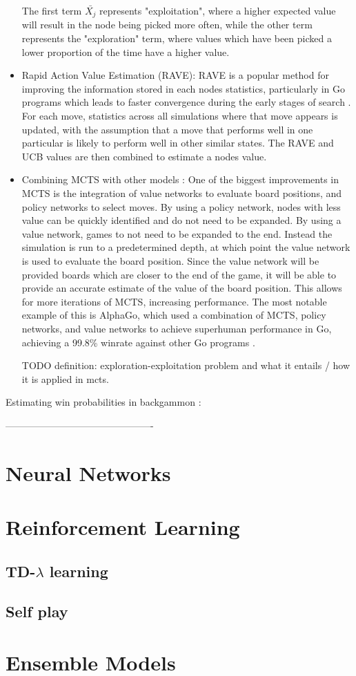 \begin{itemize}
    The first term $\bar{X_j}$ represents "exploitation", where a higher expected value will result in the node being picked more often, while the other term represents the "exploration" term, where values which have been picked a lower proportion of the time have a higher value.

    \item Rapid Action Value Estimation (RAVE): RAVE is a popular method for improving the information stored in each nodes statistics, particularly in Go programs which leads to faster convergence during the early stages of search \cite{GellySilver2007}. For each move, statistics across all simulations where that move appears is updated, with the assumption that a move that performs well in one particular is likely to perform well in other similar states. The RAVE and UCB values are then combined to estimate a nodes value.

    \item Combining MCTS with other models \cite{44806} \cite{Browne2012}: 
    One of the biggest improvements in MCTS is the integration of value networks to evaluate board positions, and policy networks to select moves. 
    By using a policy network, nodes with less value can be quickly identified and do not need to be expanded.
    By using a value network, games to not need to be expanded to the end.
    Instead the simulation is run to a predetermined depth, at which point the value network is used to evaluate the board position.
    Since the value network will be provided boards which are closer to the end of the game, it will be able to provide an accurate estimate of the value of the board position.
    This allows for more iterations of MCTS, increasing performance. The most notable example of this is AlphaGo, which used a combination of MCTS, policy networks, and value networks to achieve superhuman performance in Go, achieving a 99.8\% winrate against other Go programs \cite{44806}.

    
TODO definition: exploration-exploitation problem and what it entails / how it is applied in mcts. 
\end{itemize} 

Estimating win probabilities in backgammon \cite{estimating}: 



----------------------------------------------


\section{Neural Networks}
\section{Reinforcement Learning}
\subsection{TD-$\lambda$ learning}
\subsection{Self play}
\section{Ensemble Models}